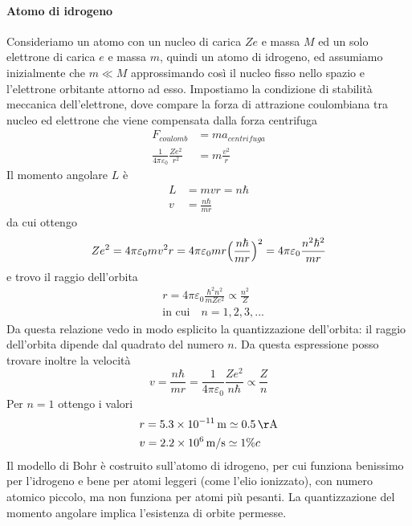 \paragraph{Atomo di idrogeno} Consideriamo un atomo con un nucleo di carica $Ze$ e massa $M$ ed un solo elettrone di carica $e$ e massa $m$, quindi un atomo di idrogeno, ed assumiamo inizialmente che $m \ll M$ approssimando così il nucleo fisso nello spazio e l'elettrone orbitante attorno ad esso.
Impostiamo la condizione di stabilità meccanica dell'elettrone, dove compare la forza di attrazione coulombiana tra nucleo ed elettrone che viene compensata dalla forza centrifuga
\begin{equation}
\begin{split}
F_{coulomb} & = ma_{centrifuga} \\ 
\frac{1}{4\pi \varepsilon_0} \frac{Z e^2}{r^2} & = m \frac{v^2}{r}
\end{split}
\end{equation}
Il momento angolare $L$ è 
\begin{equation}
\begin{split}
L & = m v r = n \hbar \\
v & = \frac{ n\hbar}{m r }
\end{split}
\end{equation}
da cui ottengo 
\begin{equation}
Ze^2 = 4 \pi \varepsilon_0 m v^2 r = 4\pi \varepsilon_0 m r \Bigl(  \frac{ n\hbar}{mr }  \Bigr)^2 = 4\pi \varepsilon_0 \frac{ n^2 \hbar^2}{m r }
\end{equation}
e trovo il raggio dell'orbita
\begin{equation}
\begin{split}
& r = 4\pi \varepsilon_0 \frac{ \hbar^2 n^2}{m Z e^2 } \propto \frac{ n^2}{Z }\\
& \mbox{in cui} \quad n = 1,2,3,...
\end{split}
\end{equation}
Da questa relazione vedo in modo esplicito la quantizzazione dell'orbita: il raggio dell'orbita dipende dal quadrato del numero $n$.
Da questa espressione posso trovare inoltre la velocità
\begin{equation}
v = \frac{ n\hbar}{m r } = \frac{ 1}{4\pi \varepsilon_0 } \frac{ Ze^2}{n\hbar } \propto \frac{ Z}{n }
\end{equation}
Per $n=1$ ottengo i valori
\begin{equation}
\begin{split}
& r = \SI{5.3e-11}{m} \simeq \SI{0.5}{\AA} \\
& v = \SI{2.2e6}{m/s} \simeq 1\% c
\end{split}
\end{equation}
Il modello di Bohr è costruito sull'atomo di idrogeno, per cui funziona benissimo per l'idrogeno e bene per atomi leggeri (come l'elio ionizzato), con numero atomico piccolo, ma non funziona per atomi più pesanti.
La quantizzazione del momento angolare implica l'esistenza di orbite permesse.
